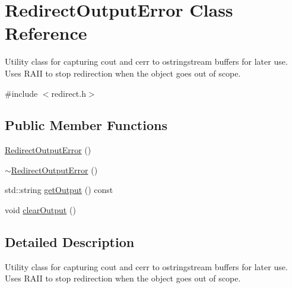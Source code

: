 \hypertarget{class_redirect_output_error}{\section{Redirect\-Output\-Error Class Reference}
\label{class_redirect_output_error}
}


Utility class for capturing cout and cerr to ostringstream buffers for later use. Uses R\-A\-I\-I to stop redirection when the object goes out of scope.  




{\ttfamily \#include $<$redirect.\-h$>$}

\subsection*{Public Member Functions}
\begin{DoxyCompactItemize}
\item 
\hyperlink{class_redirect_output_error_acc4b1edc3289f5b53521e18c930203a7}{Redirect\-Output\-Error} ()
\item 
\hyperlink{class_redirect_output_error_a8193500eba4d0483bd1a49fa15657b8a}{$\sim$\-Redirect\-Output\-Error} ()
\item 
std\-::string \hyperlink{class_redirect_output_error_af6f408593395409a0c0f294bd6bbc989}{get\-Output} () const 
\item 
void \hyperlink{class_redirect_output_error_aa2caef00995361e09e96c72cdb429cb3}{clear\-Output} ()
\end{DoxyCompactItemize}


\subsection{Detailed Description}
Utility class for capturing cout and cerr to ostringstream buffers for later use. Uses R\-A\-I\-I to stop redirection when the object goes out of scope. 

